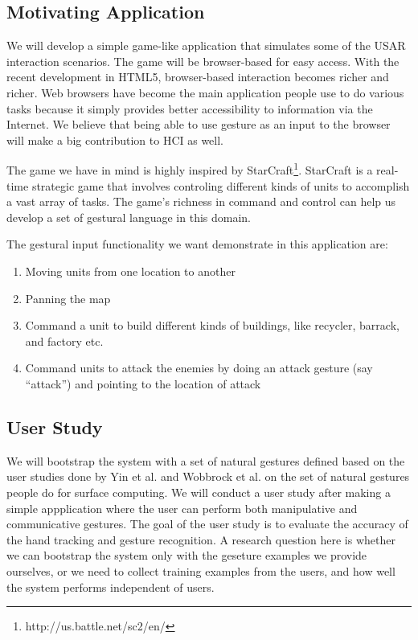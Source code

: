 \subsection{Motivating Application}
We will develop a simple game-like application that simulates some of the USAR
interaction scenarios. The game will be browser-based for easy access. With the
recent development in HTML5, browser-based interaction becomes richer and
richer. Web browsers have become the main application people use to do various
tasks because it simply provides better accessibility to information via the
Internet. We believe that being able to use gesture as an input to the browser
will make a big contribution to HCI as well.

The game we have in mind is highly inspired by
StarCraft\footnote{http://us.battle.net/sc2/en/}. StarCraft is a real-time
strategic game that involves controling different kinds of units to accomplish a vast array of tasks. The game's richness in command
and control can help us develop a set of gestural language in this domain.

The gestural input functionality we want demonstrate in this application are:

\begin{enumerate}
  \item Moving units from one location to another
  \item Panning the map
  \item Command a unit to build different kinds of buildings, like recycler,
  barrack, and factory etc.
  \item Command units to attack the enemies by doing an attack gesture (say
  ``attack'') and pointing to the location of attack
\end{enumerate}

\subsection{User Study}\label{sec:user_study}
We will bootstrap the system with a set of natural gestures defined based on the
user studies done by Yin et al. \cite{yin10} and Wobbrock et al.
\cite{wobbrock09} on the set of natural gestures people do for surface
computing. We will conduct a user study after making a simple appplication where
the user can perform both manipulative and communicative gestures. The goal of 
the user study is to evaluate the accuracy of the hand tracking and gesture 
recognition. A research question here is whether we can bootstrap the system 
only with the geseture examples we provide ourselves, or we need to collect 
training examples from the users, and how well the system performs 
independent of users.

